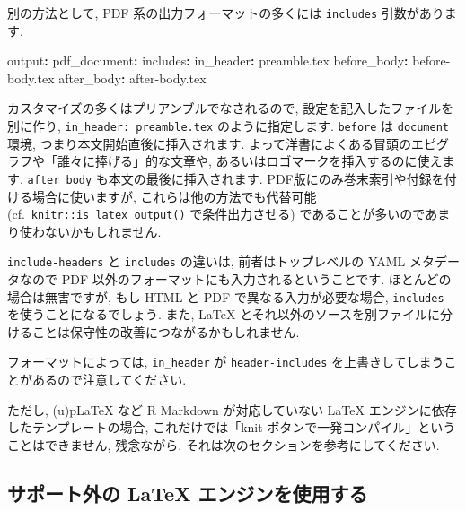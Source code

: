 \documentclass[
]{ltjsarticle}
\newenvironment{Shaded}{\begin{snugshade}}{\end{snugshade}}
\newcommand{\AttributeTok}[1]{\textcolor[rgb]{0.77,0.63,0.00}{#1}}
\newcommand{\FunctionTok}[1]{\textcolor[rgb]{0.00,0.00,0.00}{#1}}
\newcommand{\KeywordTok}[1]{\textcolor[rgb]{0.13,0.29,0.53}{\textbf{#1}}}
\newenvironment{infobox}[1]{\begin{itemize}\renewcommand{\labelitemi}{\raisebox{-.7\height}[0pt][0pt]{%
  {\setkeys{Gin}{width=3em,keepaspectratio}\texttt{[image: \_latex/\_img/\#1]}}}}
  \setlength{\fboxsep}{1em}
  \begin{greyblock}
  \item
  }{\end{greyblock}\end{itemize}
}
\begin{document}
別の方法として, PDF 系の出力フォーマットの多くには \texttt{includes} 引数があります.

\begin{Shaded}
\begin{Highlighting}[]
\FunctionTok{output}\KeywordTok{:}
\AttributeTok{  }\FunctionTok{pdf\_document}\KeywordTok{:}
\AttributeTok{    }\FunctionTok{includes}\KeywordTok{:}
\AttributeTok{      }\FunctionTok{in\_header}\KeywordTok{:}\AttributeTok{ preamble.tex}
\AttributeTok{      }\FunctionTok{before\_body}\KeywordTok{:}\AttributeTok{ before{-}body.tex}
\AttributeTok{      }\FunctionTok{after\_body}\KeywordTok{:}\AttributeTok{ after{-}body.tex}
\end{Highlighting}
\end{Shaded}

カスタマイズの多くはプリアンブルでなされるので, 設定を記入したファイルを別に作り, \texttt{in\_header:\ preamble.tex} のように指定します. \texttt{before} は \texttt{document} 環境, つまり本文開始直後に挿入されます. よって洋書によくある冒頭のエピグラフや「誰々に捧げる」的な文章や, あるいはロゴマークを挿入するのに使えます. \texttt{after\_body} も本文の最後に挿入されます. PDF版にのみ巻末索引や付録を付ける場合に使いますが, これらは他の方法でも代替可能 (cf.~\texttt{knitr::is\_latex\_output()} で条件出力させる) であることが多いのであまり使わないかもしれません.

\texttt{include-headers} と \texttt{includes} の違いは, 前者はトップレベルの YAML メタデータなので PDF 以外のフォーマットにも入力されるということです. ほとんどの場合は無害ですが, もし HTML と PDF で異なる入力が必要な場合, \texttt{includes} を使うことになるでしょう. また, LaTeX とそれ以外のソースを別ファイルに分けることは保守性の改善につながるかもしれません.

\begin{infobox}{important}
フォーマットによっては, \texttt{in\_header} が \texttt{header-includes} を上書きしてしまうことがあるので注意してください.

\end{infobox}

ただし, (u)pLaTeX など R Markdown が対応していない LaTeX エンジンに依存したテンプレートの場合, これだけでは「knit ボタンで一発コンパイル」ということはできません, 残念ながら. それは次のセクションを参考にしてください.

\hypertarget{ux30b5ux30ddux30fcux30c8ux5916ux306e-latex-ux30a8ux30f3ux30b8ux30f3ux3092ux4f7fux7528ux3059ux308b}{%
\subsection{サポート外の LaTeX エンジンを使用する}\label{ux30b5ux30ddux30fcux30c8ux5916ux306e-latex-ux30a8ux30f3ux30b8ux30f3ux3092ux4f7fux7528ux3059ux308b}}
\end{document}
